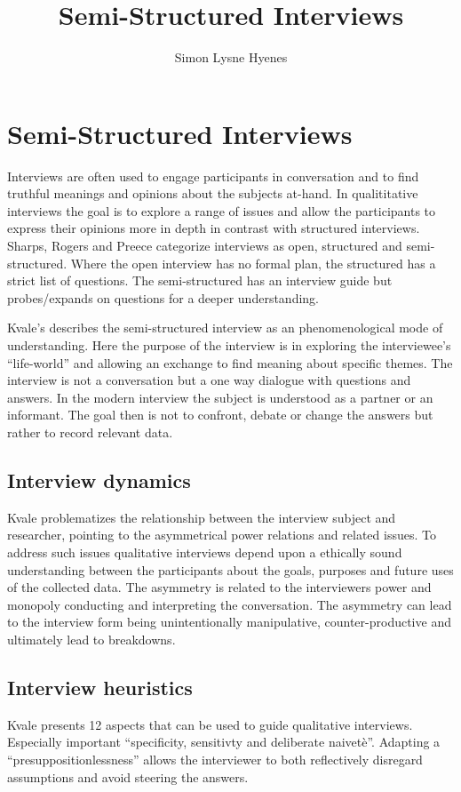 \documentclass[11pt,UKenglish, a4paper]{article}
\author{Simon Lysne Hyenes}
\title{Semi-Structured Interviews}
\begin{document}
\section{Semi-Structured Interviews}
Interviews are often used to engage participants in conversation and to find truthful meanings and opinions about the subjects at-hand. In qualititative interviews the goal is to explore a range of issues and allow the participants to express their opinions more in depth in contrast with structured interviews. Sharps, Rogers and Preece categorize interviews as open, structured and semi-structured. Where the open interview has no formal plan, the structured has a strict list of questions. The semi-structured has an interview guide but probes/expands on questions for a deeper understanding\cite[p.299]{Sharp2007Interaction}.

Kvale's describes the semi-structured interview as an phenomenological mode of understanding. Here the purpose of the interview is in exploring the interviewee's ``life-world''\cite[p.174]{Kvale1983Qualitative} and allowing an exchange to find meaning about specific themes\cite[p.175]{Kvale1983Qualitative}. The interview is not a conversation but a one way dialogue with questions and answers. In the modern interview the subject is understood as a partner or an informant. The goal then is not to confront, debate or change the answers but rather to record relevant data.

\subsection{Interview dynamics}
Kvale problematizes the relationship between the interview subject and researcher, pointing to the asymmetrical power relations and related issues\cite[p.483]{Kvale2006Dominance}. To address such issues qualitative interviews depend upon a ethically sound understanding between the participants about the goals, purposes and future uses of the collected data. The asymmetry is related to the interviewers power and monopoly conducting and interpreting the conversation\cite[p.33]{Kvale2009Interviews}. The asymmetry can lead to the interview form being unintentionally manipulative, counter-productive and ultimately lead to breakdowns.

\subsection{Interview heuristics}
Kvale presents 12 aspects that can be used to guide qualitative interviews. Especially important ``specificity, sensitivty and deliberate naivetè''\cite[p.28]{Kvale2009Interviews}. Adapting a ``presuppositionlessness''\cite[p.31]{Kvale2006Dominance} allows the interviewer to both reflectively disregard assumptions and avoid steering the answers. 
\end{document}
